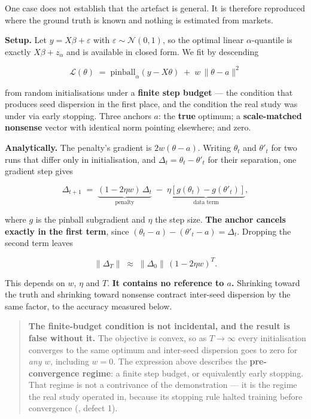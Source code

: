 One case does not establish that the artefact is general. It is therefore reproduced where the
ground truth is known and nothing is estimated from markets.

\textbf{Setup.} Let \(y = X\beta + \varepsilon\) with \(\varepsilon \sim \mathcal{N}(0,1)\), so the
optimal linear \(\alpha\)-quantile is exactly \(X\beta + z_\alpha\) and is available in closed form.
We fit by descending

\[\mathcal{L}(\theta) \;=\; \mathrm{pinball}_\alpha(y - X\theta) \;+\; w\,\lVert \theta - a \rVert^2\]

from random initialisations under a \textbf{finite step budget} --- the condition that produces seed
dispersion in the first place, and the condition the real study was under via early stopping.
Three anchors \(a\): the \textbf{true} optimum; a \textbf{scale-matched nonsense} vector with identical norm
pointing elsewhere; and zero.

\textbf{Analytically.} The penalty's gradient is \(2w(\theta - a)\). Writing \(\theta_t\) and
\(\theta'_t\) for two runs that differ only in initialisation, and \(\Delta_t = \theta_t -
\theta'_t\) for their separation, one gradient step gives

\[\Delta_{t+1} \;=\; \underbrace{(1 - 2\eta w)\,\Delta_t}_{\text{penalty}} \;-\; \underbrace{\eta\left[g(\theta_t) - g(\theta'_t)\right]}_{\text{data term}},\]

where \(g\) is the pinball subgradient and \(\eta\) the step size. \textbf{The anchor cancels exactly in
the first term}, since \((\theta_t - a) - (\theta'_t - a) = \Delta_t\). Dropping the second term
leaves

\[\lVert \Delta_T \rVert \;\approx\; \lVert \Delta_0 \rVert \,(1 - 2\eta w)^T .\]

This depends on \(w\), \(\eta\) and \(T\). \textbf{It contains no reference to \(a\).} Shrinking toward the
truth and shrinking toward nonsense contract inter-seed dispersion by the same factor, to the
accuracy measured below.

\begin{quote}
\textbf{The finite-budget condition is not incidental, and the result is false without it.} The
objective is convex, so as \(T \to \infty\) every initialisation converges to the same optimum
and inter-seed dispersion goes to zero for \emph{any} \(w\), including \(w = 0\). The expression above
describes the \textbf{pre-convergence regime}: a finite step budget, or equivalently early
stopping. That regime is not a contrivance of the demonstration --- it is the regime the real
study operated in, because its stopping rule halted training before convergence (, defect 1).
\end{quote}

